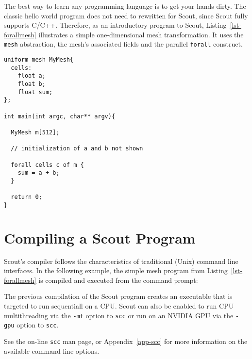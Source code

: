 The best way to learn any programming language is to get your hands dirty.  The classic
{hello world} program does not need to rewritten for Scout, since Scout fully supports
C/C++.  Therefore, as an introductory program to Scout, Listing~\ref{lst-forallmesh}  
illustrates a simple one-dimensional mesh transformation.  It uses the \texttt{mesh}
abstraction, the mesh's associated fields and the parallel \texttt{forall} construct.

\par\bigskip
\begin{lstlisting}[label=lst-forallmesh,caption={Simple mesh example.}]
uniform mesh MyMesh{
  cells:
    float a;
    float b;
    float sum;
};

int main(int argc, char** argv){

  MyMesh m[512];

  // initialization of a and b not shown

  forall cells c of m {
    sum = a + b;
  }

  return 0;
}
\end{lstlisting}
\par\bigskip\noindent

\section{Compiling a Scout Program}
\label{ch1:compiling}

Scout's compiler follows the characteristics of traditional (Unix) command line interfaces.  In 
the following example, the simple mesh program from Listing~\ref{lst-forallmesh} is compiled and 
executed from the command prompt:

\par\bigskip
{}
\par\bigskip\noindent

The previous compilation of the Scout program creates an executable that is targeted to run
sequentiall on a CPU.  Scout can also be enabled to run CPU multithreading via the \texttt{-mt}
option to \texttt{scc} or run on an NVIDIA GPU via the \texttt{-gpu} option to \texttt{scc}.

See the on-line \texttt{scc} man page, or Appendix~\ref{app-scc} for more information on the
available command line options.
